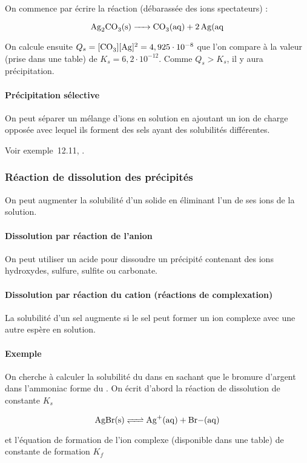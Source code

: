 On commence par écrire la réaction (débarassée des ions spectateurs) :

$$\ce{Ag2CO3(s) -> CO3(aq) + 2Ag(aq}$$

On calcule ensuite $Q_s = [\ce{CO3}][\ce{Ag}]^2 = 4,925 \cdot 10^{-8}$ que l'on compare
à la valeur (prise dans une table) de $K_s = 6,2 \cdot 10^{-12}$.
Comme $Q_s > K_s$, il y aura précipitation.

\paragraph{Précipitation sélective}
On peut séparer un mélange d'ions en solution en ajoutant un ion
de charge opposée avec lequel ils forment des sels ayant des solubilités
différentes.

Voir exemple~12.11, \cite[p.~503]{atkins2011principes}.

\subsubsection{Réaction de dissolution des précipités}
On peut augmenter la solubilité d'un solide en éliminant l'un de ses ions
de la solution.

\paragraph{Dissolution par réaction de l'anion}
On peut utiliser un acide pour dissoudre un précipité contenant
des ions hydroxydes, sulfure, sulfite ou carbonate.

\paragraph{Dissolution par réaction du cation (réactions de complexation)}
La solubilité d'un sel augmente si le sel peut former un ion
complexe avec une autre espère en solution.

\paragraph{Exemple}
On cherche à calculer la solubilité du  dans  en 
sachant que le bromure d'argent dans l'ammoniac forme du .
On écrit d'abord la réaction de dissolution de constante $K_s$

$$\ce{AgBr(s) <=> Ag+(aq) + Br-(aq)}$$

et l'équation de formation de l'ion complexe (disponible dans une table)
de constante de formation $K_f$

